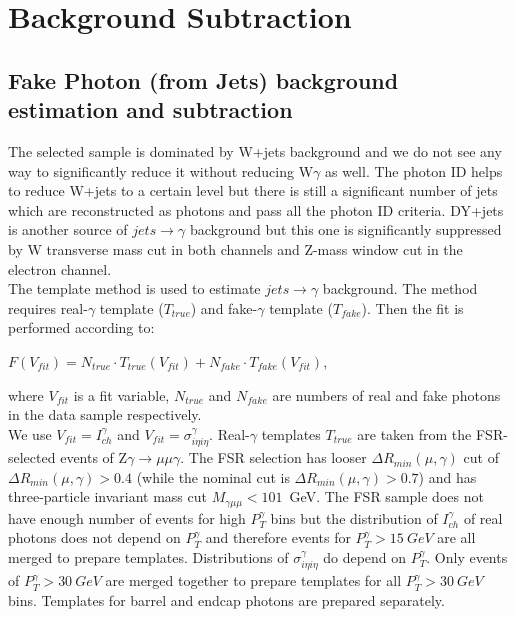 \section{Background Subtraction}
\label{sec:BackgroundSubtraction}

\subsection{Fake Photon (from Jets) background estimation and subtraction}
The selected sample is dominated by W+jets background and we do not see any way to significantly reduce it without reducing W$\gamma$ as well. The photon ID helps to reduce W+jets to a certain level but there is still a significant number of jets which are reconstructed as photons and pass all the photon ID criteria. DY+jets is another source of $jets \rightarrow \gamma$ background but this one is significantly suppressed by W transverse mass cut in both channels and Z-mass window cut in the electron channel.\\

The template method is used to estimate $jets \rightarrow \gamma$ background. The method requires real-$\gamma$ template ($T_{true}$) and fake-$\gamma$ template ($T_{fake}$). Then the fit is performed according to: \\
\begin{center}
$F(V_{fit})=N_{true} \cdot T_{true}(V_{fit}) + N_{fake} \cdot T_{fake}(V_{fit})$,
\end{center}
where $V_{fit}$ is a fit variable, $N_{true}$ and $N_{fake}$ are numbers of real and fake photons in the data sample respectively. \\

We use $V_{fit}=I_{ch}^{\gamma}$ and $V_{fit}=\sigma_{i\eta i\eta}^{\gamma}$. Real-$\gamma$ templates $T_{true}$ are taken from the FSR-selected events of Z$\gamma\rightarrow\mu\mu\gamma$. The FSR selection has looser $\Delta R_{min}(\mu,\gamma)$ cut of $\Delta R_{min}(\mu,\gamma)>0.4$ (while the nominal cut is $\Delta R_{min}(\mu,\gamma)>0.7$) and has three-particle invariant mass cut $M_{\gamma\mu\mu}<101$~GeV. The FSR sample does not have enough number of events for high $P_{T}^{\gamma}$ bins but the distribution of $I_{ch}^{\gamma}$ of real photons does not depend on $P_{T}^{\gamma}$ and therefore events for $P_{T}^{\gamma}>15~GeV$ are all merged to prepare templates. Distributions of $\sigma_{i\eta i\eta}^{\gamma}$ do depend on $P_T^{\gamma}$. Only events of $P_T^{\gamma}>30~GeV$ are merged together to prepare templates for all $P_T^{\gamma}>30~GeV$ bins. Templates for barrel and endcap photons are prepared separately.\\

